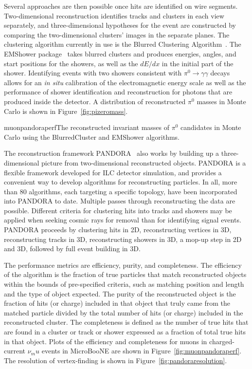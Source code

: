 Several approaches are then possible once hits are identified on wire
segments.  Two-dimensional reconstruction identifies tracks and
clusters in each view separately, and three-dimensional hypotheses for
the event are constructed by comparing the two-dimensional clusters'
images in the separate planes.  The clustering algorithm currently in
use is the Blurred Clustering Algorithm~\cite{blurredclustering}.  The
EMShower package~\cite{emshowerpackage} takes blurred clusters and
produces energies, angles, and start positions for the showers, as
well as the $dE/dx$ in the initial part of the shower.  Identifying
events with two showers consistent with $\pi^0\rightarrow\gamma\gamma$
decays allows for an {\it in situ} calibration of the electromagnetic
energy scale as well as the performance of shower identification and
reconstruction for photons that are produced inside the detector.  A
distribution of reconstructed $\pi^0$ masses in Monte Carlo is shown
in Figure~\ref{fig:pizeromass}.

\begin{cdrfigure}{muonpandoraperf}{The reconstructed invariant masses of $\pi^0$ candidates in
  Monte Carlo using the BlurredCluster and EMShower algorithms.}
\end{cdrfigure}

The reconstruction framework PANDORA~\cite{pandora} also works by
building up a three-dimensional picture from two-dimensional
reconstructed objects.  PANDORA is a flexible framework developed for
ILC detector simulation, and provides a convenient way to develop
algorithms for reconstructing particles.  In all, more than 80
algorithms, each targeting a specific topology, have been incorporated
into PANDORA to date.  Multiple passes through reconstructing the data
are possible.  Different criteria for clustering hits into tracks and
showers may be applied when seeking cosmic rays for removal than for
identifying signal events.  PANDORA proceeds by clustering hits in 2D,
reconstructing vertices in 3D, reconstructing tracks in 3D,
reconstructing showers in 3D, a mop-up step in 2D and 3D, followed by
full event building in 3D.

The performance metrics are efficiency, purity, and completeness.  The
efficiency of the algorithm is the fraction of true particles that
match reconstructed objects within the bounds of pre-specified
criteria, such as matching position and length and the type of object
expected.  The purity of the reconstructed object is the fraction of
hits (or charge) included in that object that truly came from the
matched particle divided by the total number of hits (or charge)
included in the reconstructed cluster.  The completeness is defined as
the number of true hits that are found in a cluster or track or shower
expressed as a fraction of total true hits in that object.  Plots of
the efficiency and completeness for muons in charged-current $\nu_mu$
events in MicroBooNE are shown in Figure~\ref{fig:muonpandoraperf}.
The resolution of vertex-finding is shown in
Figure~\ref{fig:pandoraresolution}.


